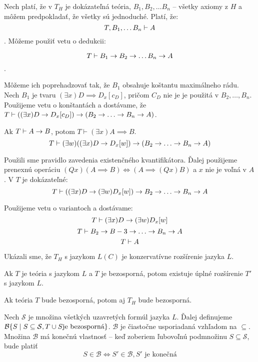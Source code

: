 \begin{dokaz}
Nech platí, že v $T_H$ je dokázateľná teória, $B_1, B_2, \ldots B_n$ -- všetky
axiomy z $H$ a môžem predpokladať, že všetky sú jednoduché. Platí, že:
$$ T, B_1, \ldots B_n \vdash A $$. Môžeme použiť vetu o dedukcii:

$$ T \vdash B_1 \rightarrow B_2 \rightarrow \ldots B_n \rightarrow A $$.

Môžeme ich poprehadzovať tak, že $B_1$ obsahuje koštantu maximálneho rádu. Nech
$B_1$ je tvaru $(\exists x) D \implies D_x[c_D]$, pričom $C_D$ nie je je použitá
v $B_2, \ldots, B_n$. Použijeme vetu o konštantách a dostávame, že $T \vdash
((\exists x) D \rightarrow D_x[c_D] ) \rightarrow (B_2 \rightarrow \ldots \rightarrow B_n
\rightarrow A)$.

\par Ak $T \vdash A \rightarrow B$, potom $T\vdash (\exists x) A \implies B$.
$$ T\vdash (\exists w) ((\exists x)D \rightarrow D_x[w]) \rightarrow (B_2 \rightarrow
\ldots \rightarrow B_n \rightarrow A)$$

Použili sme pravidlo zavedenia existenčného kvantifikátora. Ďalej použijeme
prenexnú operáciu $(Qx) (A\implies B) \iff (A\implies (Qx)B)$ a $x$ nie je voľná
v $A$. V $T$ je dokázateľné:
$$T \vdash ((\exists x) D \rightarrow (\exists w)D_x[w]) \rightarrow B_2 \rightarrow \ldots \rightarrow B_n \rightarrow A$$

Použijeme vetu o variantoch a dostávame:
$$ T \vdash ( \exists x ) D \rightarrow (\exists w) D_x[w] $$
$$ T \vdash B_2 \rightarrow B-3 \rightarrow \ldots \rightarrow B_n \rightarrow A $$
$$ T \vdash A$$

Ukázali sme, že $T_H$ s jazykom $L(C)$ je konzervatívne rozšírenie jazyka $L$.
\end{dokaz}

\begin{veta}[Lindenbaum]
    Ak $T$ je teória s jazykom $L$ a $T$ je
    bezosporná, potom existuje úplné rozšírenie $T'$ s jazykom $L$.

    Ak teória $T$ bude bezosporná, potom aj $T_H$ bude bezosporná.
\end{veta}
\begin{dokaz}
    Nech $\mathcal{S}$ je množina všetkých uzavretých formúl jazyka $L$.
    Ďalej definujeme 
        $\mathcal{B} \{ S \mid S \subseteq \mathcal{S}, T \cup S
    \mbox{je bezosporná}\}$.
    $\mathcal{B}$ je čiastočne usporiadaná vzhľadom na $\subseteq$.
    Množina $\mathcal{B}$ má konečnú vlastnosť -- 
    keď zoberiem ľubovoľnú podmnožinu $S \subseteq \mathcal{S}$,
    bude platiť 
    \begin{equation*}
        S \in \mathcal{B} \iff S' \in \mathcal{B}, S' \mbox{ je konečná}
    \end{equation*}
\end{dokaz} 


